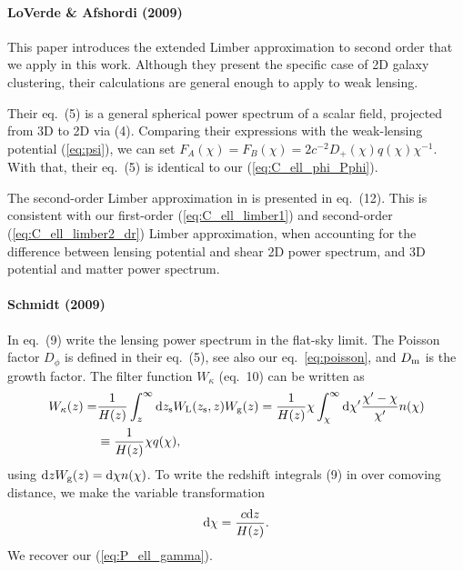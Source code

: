 \documentclass[fleqn,usenatbib]{mnras} %
\begin{document}
\begin{appendix}
\paragraph{LoVerde \& Afshordi (2009)}

This paper introduces the extended Limber approximation to second order that we
apply in this work. Although they present the specific case of 2D galaxy
clustering, their calculations are general enough to apply to weak lensing.

Their eq.~(5) is a general spherical power spectrum of a scalar field,
projected from 3D to 2D via (4). Comparing their expressions with the
weak-lensing potential (\ref{eq:psi}), we can set $F_A(\chi) = F_B(\chi) = 2
c^{-2} D_+(\chi) q(\chi) \chi^{-1}$. With that, their eq.~(5) is identical to
our (\ref{eq:C_ell_phi_Pphi}).

The second-order Limber approximation in \cite{2008PhRvD..78l3506L} is presented in
eq.~(12). This is consistent with our first-order (\ref{eq:C_ell_limber1}) and
second-order (\ref{eq:C_ell_limber2_dr}) Limber approximation, when accounting for the difference between
lensing potential and shear 2D power spectrum, and 3D potential and matter power spectrum.


\paragraph{Schmidt (2009)}

In eq.~(9) \cite{2008PhRvD..78d3002S} write the lensing power spectrum in the
flat-sky limit. The Poisson factor $D_\phi$ is defined in their eq.~(5), see
also our eq.~\ref{eq:poisson}, and $D_{\rm m}$ is the growth factor. The filter
function $W_\kappa$ (eq.~10) can be written as
%
\begin{align}
  W_\kappa(z) = & \frac 1 {H(z)} \int_z^\infty {\rm d} z_{\rm s} W_{\rm L}(z_{\rm s}, z) W_{\rm g}(z)
              =  \frac 1 {H(z)} \chi \int_\chi^\infty {\rm d} \chi^\prime \frac{\chi^\prime - \chi}{\chi^\prime}
                n(\chi)
              \nonumber \\
              & \equiv \frac 1 {H(z)} \chi q(\chi),
\end{align}
%
using ${\rm d} z W_{\rm g}(z) = {\rm d} \chi n(\chi)$.
To write the redshift integrals (9) in \cite{2008PhRvD..78d3002S} over 
comoving distance, we make the variable transformation
%
\begin{equation}
  {\rm d} \chi = \frac{c {\rm d} z}{H(z)} .
\end{equation}
%
We recover our (\ref{eq:P_ell_gamma}).


\end{appendix}
\end{document}

